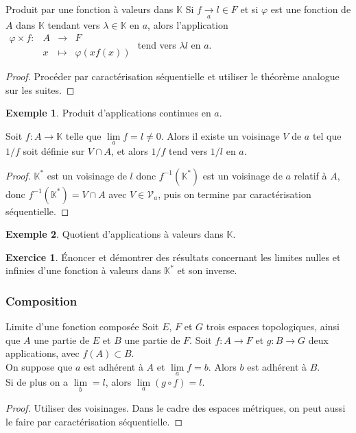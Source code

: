 \documentclass[french]{article}
\newcommand{\K}{\mathbb{K}}
\newcommand{\st}{^*}
\newcommand{\inv}{^{-1}}
\theoremstyle{plain}
\theoremstyle{definition}
\newtheorem*{ex}{Exemple}
\newtheorem{exo}{Exercice}
\theoremstyle{remark}
\begin{document}
\begin{thm}{Produit par une fonction à valeurs dans $\K$}
	Si $f\xrightarrow[a]{}l\in F$ et si $\varphi$ est une fonction de $A$ dans $\K$ tendant vers $\lambda\in\K$ en $a$, alors l'application
	$\begin{array}{lrcl}
		\varphi\times f:&A&\longrightarrow& F\\
		&x&\longmapsto&\varphi(xf(x))
	\end{array}$ tend vers $\lambda l$ en $a$.
\end{thm}
\begin{proof}
	Procéder par caractérisation séquentielle et utiliser le théorème analogue sur les suites.
\end{proof}

\begin{ex}
	Produit d'applications continues en $a$.
\end{ex}

\begin{thm}{}
	Soit $f:A\to\K$ telle que $\underset{a}{\lim}f=l\ne0$. Alors il existe un voisinage $V$ de $a$ tel que $1/f$ soit définie sur $V\cap A$, et alors $1/f$ tend vers $1/l$ en $a$.
\end{thm}
\begin{proof}
	$\K\st$ est un voisinage de $l$ donc $f\inv(\K\st)$ est un voisinage de $a$ relatif à $A$, donc $f\inv(\K\st)=V\cap A$ avec $V\in\mathcal{V}_a$, puis on termine par caractérisation séquentielle.
\end{proof}

\begin{ex}
	Quotient d'applications à valeurs dans $\K$.
\end{ex}

\begin{exo}
	Énoncer et démontrer des résultats concernant les limites nulles et infinies d'une fonction à valeurs dans $\K\st$ et son inverse.
\end{exo}

\subsubsection*{Composition}

\begin{thm}{Limite d'une fonction composée}%
	Soit $E$, $F$ et $G$ trois espaces topologiques, ainsi que $A$ une partie de $E$ et $B$ une partie de $F$. Soit $f:A\to F$ et $g:B\to G$ deux applications, avec $f(A)\subset B$. \\
	On suppose que $a$ est adhérent à $A$ et $\underset{a}{\lim}f=b$. Alors $b$ est adhérent à $B$.\\
	Si de plus on a $\underset{b}{\lim}=l$, alors $\underset{a}{\lim}(g\circ f)=l$.
\end{thm}
\begin{proof}
	Utiliser des voisinages. Dans le cadre des espaces métriques, on peut aussi le faire par caractérisation séquentielle.
\end{proof}
\end{document}
